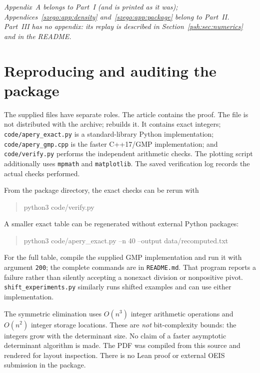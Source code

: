 \documentclass[11pt,a4paper]{article}
\numberwithin{equation}{section}
\theoremstyle{remark}\newtheorem{remark}[theorem]{Remark}
\begin{document}
\appendix
\noindent\emph{Appendix~A belongs to Part~I (and is printed as it was);
Appendices~\ref{szego:app:density} and~\ref{szego:app:package} belong to
Part~II. Part~III has no appendix: its replay is described in
Section~\ref{psh:sec:numerics} and in the README.}

\section{Reproducing and auditing the package}
The supplied files have separate roles. The article contains the proof.
The file  is not distributed with the
archive;  rebuilds it. It contains exact integers;
\texttt{code/apery\_exact.py} is a standard-library Python implementation;
\texttt{code/apery\_gmp.cpp} is the faster C++17/GMP implementation;
and \texttt{code/verify.py} performs the independent arithmetic checks.
The plotting script additionally uses \texttt{mpmath} and \texttt{matplotlib}.
The saved verification log records the actual checks performed.

From the package directory, the exact checks can be rerun with
\begin{quote}\small\ttfamily
python3 code/verify.py
\end{quote}
A smaller exact table can be regenerated without external Python packages:
\begin{quote}\small\ttfamily
python3 code/apery\_exact.py --n 40 --output data/recomputed.txt
\end{quote}
For the full table, compile the supplied GMP implementation and run it with
argument \texttt{200}; the complete commands are in \texttt{README.md}.
That program reports a failure rather than silently accepting a nonexact
division or nonpositive pivot. \texttt{shift\_experiments.py} similarly runs
shifted examples and can use either implementation.

The symmetric elimination uses $O(n^3)$ integer arithmetic operations and
$O(n^2)$ integer storage locations. These are \emph{not} bit-complexity bounds:
the integers grow with the determinant size. No claim of a faster asymptotic
determinant algorithm is made. The PDF was compiled from this source and
rendered for layout inspection. There is no Lean proof or external OEIS
submission in the package.
\end{document}
